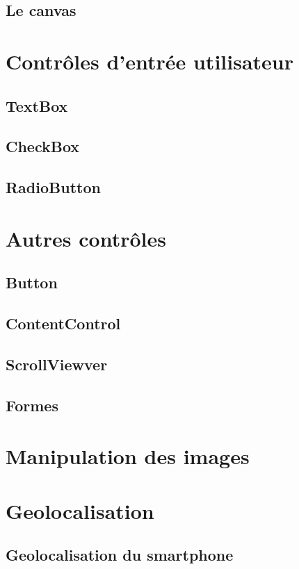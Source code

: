 \documentclass[twoside,UTF8]{EPURapport}
\begin{document}
		\subsection{Le canvas}

	\section{Contrôles d'entrée utilisateur}
		\subsection{TextBox}
		\subsection{CheckBox}
		\subsection{RadioButton}
		
	\section{Autres contrôles}
		\subsection{Button}
		\subsection{ContentControl}
		\subsection{ScrollViewver}
		\subsection{Formes}
		
	\section{Manipulation des images}
	
	\section{Geolocalisation}
		\subsection{Geolocalisation du smartphone}
		
\end{document}
